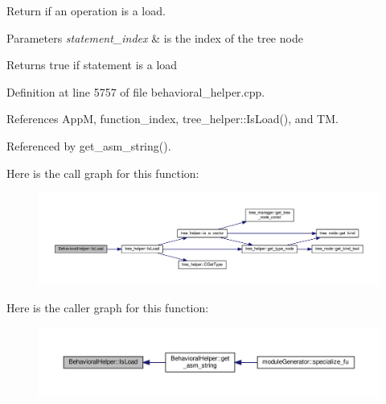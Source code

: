 Return if an operation is a load. 


\begin{DoxyParams}{Parameters}
{\em statement\+\_\+index} & is the index of the tree node \\
\hline
\end{DoxyParams}
\begin{DoxyReturn}{Returns}
true if statement is a load 
\end{DoxyReturn}


Definition at line 5757 of file behavioral\+\_\+helper.\+cpp.



References AppM, function\+\_\+index, tree\+\_\+helper\+::\+Is\+Load(), and TM.



Referenced by get\+\_\+asm\+\_\+string().

Here is the call graph for this function\+:
\nopagebreak
\begin{figure}[H]
\begin{center}
\leavevmode
\includegraphics[width=350pt]{dd/db2/classBehavioralHelper_a39727c79473322e5994e5f5497c179ce_cgraph}
\end{center}
\end{figure}
Here is the caller graph for this function\+:
\nopagebreak
\begin{figure}[H]
\begin{center}
\leavevmode
\includegraphics[width=350pt]{dd/db2/classBehavioralHelper_a39727c79473322e5994e5f5497c179ce_icgraph}
\end{center}
\end{figure}
\mbox{\label{classBehavioralHelper_ab73c076216b524091752657d4c399fda}} 
